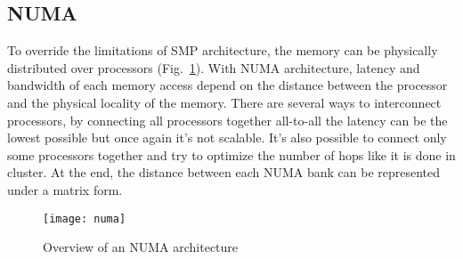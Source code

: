 \subsection{NUMA}
To override the limitations of SMP architecture, the memory can be physically distributed over processors (Fig.~\ref{fig:numa}).
%
With NUMA architecture, latency and bandwidth of each memory access depend on the distance between the processor and the physical locality of the memory.
%
There are several ways to interconnect processors, by connecting all processors together all-to-all the latency can be the lowest possible but once again it's not scalable.
%
It's also possible to connect only some processors together and try to optimize the number of hops like it is done in cluster.
%
At the end, the distance between each NUMA bank can be represented under a matrix form.

\begin{figure}[!ht]
  \centering
  \texttt{[image: numa]}
  \caption{Overview of an NUMA architecture}
  \label{fig:numa}
\end{figure}
